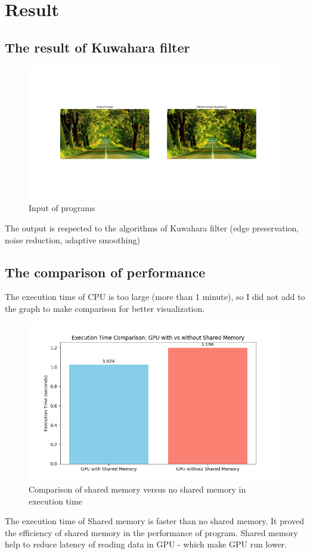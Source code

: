 \documentclass{article}
\begin{document}
\section{Result}
\subsection{The result of Kuwahara filter}
\begin{figure} [H]
    \centering
    \includegraphics[width=1\linewidth]{input_output.png}
    \caption{Input of programs}
    \label{fig:enter-label}
\end{figure}
The output is respected to the algorithms of Kuwahara filter (edge preservation, noise reduction, adaptive smoothing)
\subsection{The comparison of performance}
The execution time of CPU is too large (more than 1 minute), so I did not add to the graph to make comparison for better visualization.
\begin{figure} [H]
    \centering
    \includegraphics[width=1\linewidth]{comparison.png}
    \caption{Comparison of shared memory versus no shared memory in execution time}
    \label{fig:enter-label}
\end{figure}
The execution time of Shared memory is faster than no shared memory. It proved the efficiency of shared memory in the performance of program. Shared memory help to reduce latency of reading data in GPU - which make GPU run lower.
\end{document}
